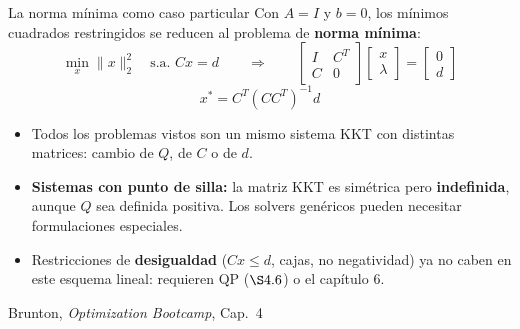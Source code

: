 \documentclass[10pt,aspectratio=169]{beamer}
\newcommand{\fuente}{\vfill{\scriptsize\color{gray}Brunton, \emph{Optimization Bootcamp}, Cap.~4}}
\begin{document}
\begin{frame}{La norma mínima como caso particular}
  \small
  Con $A=I$ y $b=0$, los mínimos cuadrados restringidos se reducen al problema de 
  \textbf{norma mínima}:
  \[
    \min_x \|x\|_2^2 \quad\text{s.a. } Cx=d
    \qquad\Longrightarrow\qquad
    \begin{bmatrix} I & C^T \\ C & 0 \end{bmatrix}
    \begin{bmatrix} x \\ \lambda \end{bmatrix}
    =
    \begin{bmatrix} 0 \\ d \end{bmatrix} \tag{4.50}
  \]
  \[
    x^* = C^T(CC^T)^{-1}d
  \]

  \vspace{1mm}
  \begin{itemize}
    \item Todos los  problemas vistos  son un mismo sistema KKT con distintas matrices:
      cambio de $Q$, de $C$ o de $d$.
    \item \textbf{Sistemas con punto de silla:} la matriz KKT es simétrica pero
      \textbf{indefinida}, aunque $Q$ sea definida positiva. Los solvers
      genéricos pueden necesitar formulaciones especiales.
    \item Restricciones de \textbf{desigualdad} ($Cx \le d$, cajas, no
      negatividad) ya no caben en este esquema lineal: requieren QP ($\S4{.}6$)
      o el capítulo 6.
  \end{itemize}
  \fuente
\end{frame}
\end{document}
